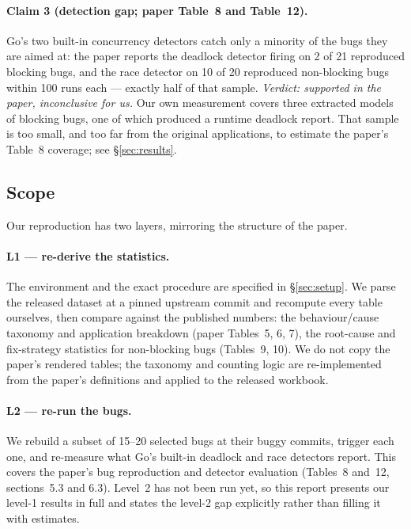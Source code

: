 \documentclass[11pt]{article}
\begin{document}
\paragraph{Claim 3 (detection gap; paper Table~8 and Table~12).} Go's two
built-in concurrency detectors catch only a minority of the bugs they are
aimed at: the paper reports the deadlock detector firing on 2 of 21
reproduced blocking bugs, and the race detector on 10 of 20 reproduced
non-blocking bugs within 100 runs each --- exactly half of that sample.
\emph{Verdict: supported in the paper, inconclusive for us.} Our own
measurement covers three extracted models of blocking bugs, one of which
produced a runtime deadlock report. That sample is too small, and too far
from the original applications, to estimate the paper's Table~8 coverage; see
\S\ref{sec:results}.

\subsection{Scope}

Our reproduction has two layers, mirroring the structure of the paper.

\paragraph{L1 --- re-derive the statistics.} The environment and the exact procedure are specified in \S\ref{sec:setup}. We parse the released dataset
at a pinned upstream commit and recompute every table ourselves, then
compare against the published numbers: the behaviour/cause taxonomy and
application breakdown (paper Tables~5, 6, 7), the root-cause and fix-strategy
statistics for non-blocking bugs (Tables~9, 10). We do not copy the paper's
rendered tables; the taxonomy and counting logic are re-implemented from the
paper's definitions and applied to the released workbook.

\paragraph{L2 --- re-run the bugs.} We rebuild a subset of 15--20 selected
bugs at their buggy commits, trigger each one, and re-measure what Go's
built-in deadlock and race detectors report. This covers the paper's bug
reproduction and detector evaluation (Tables~8 and~12, sections~5.3 and
6.3). Level~2 has not been run yet, so this report presents our level-1
results in full and states the level-2 gap explicitly rather than filling it
with estimates.
\end{document}
